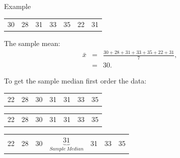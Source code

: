 \begin{frame}{Example}

  \begin{tabular}{lllllll}
    30 & 28 & 31 & 33 & 35 & 22 & 31
  \end{tabular}

  The sample mean:
  \begin{eqnarray*}
    \bar{x} & = & \frac{30 + 28 + 31 + 33 + 35 + 22 + 31}{7}, \\
    & = & 30.
  \end{eqnarray*}

  To get the sample median first order the data: \\
  {
    \begin{tabular}{lllllll}
      22 & 28 & 30 & 31 & 31 & 33 & 35
    \end{tabular}
  }

  {
    \begin{tabular}{lllllll}
      {\color{red}22} & {\color{red}28} & {\color{red}30} & 31 & {\color{blue}31} & {\color{blue}33} & {\color{blue}35}
    \end{tabular}
  }

  {
    \begin{tabular}{lllllll}
      {\color{red}22} & {\color{red}28} & {\color{red}30} &
      $\underbrace{31}_{Sample~Median}$ & {\color{blue}31} & {\color{blue}33} & {\color{blue}35}
    \end{tabular}
  }
  
\end{frame}


